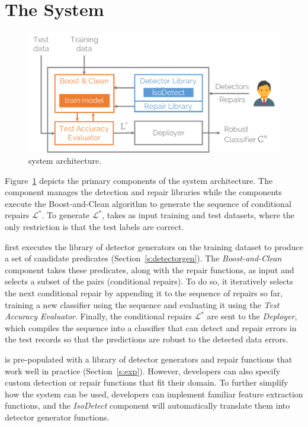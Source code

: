 \section{The \sys System}\label{s:arch}
 
\begin{figure}[t]
\centering
\includegraphics[width=\columnwidth]{figures/arch.pdf}
\caption{\sys system architecture.}
\label{f:arch}
\end{figure}

Figure~\ref{f:arch} depicts the primary components of the system architecture. The  component manages the detection and repair libraries while the  components execute the Boost-and-Clean algorithm to generate the sequence of conditional repairs $\mathcal{L}^*$.  To generate $\mathcal{L}^*$, \sys takes as input training and test datasets, where the only restriction is that the test labels are correct. 

\sys first executes the library of detector generators on the training dataset to produce a set of candidate predicates (Section~\ref{s:detectorgen}).    The {\it Boost-and-Clean} component takes these predicates, along with the repair functions, as input and selects a subset of the pairs (conditional repairs).  To do so, it iteratively selects the next conditional repair by appending it to the sequence of repairs so far, training a new classifier using the sequence and evaluating it using the {\it Test Accuracy Evaluator}.  Finally, the conditional repairs $\mathcal{L}^*$ are sent to the {\it Deployer}, which compiles the sequence into a  classifier that can detect and repair errors in the test records so that the predictions are robust to the detected data errors.  

\sys is pre-populated with a library of detector generators and repair functions that work well in practice (Section~\ref{s:exp}).  However,  developers can also specify custom detection or repair functions that fit their domain.  To further simplify how the system can be used, developers can implement familiar feature extraction functions, and the {\it IsoDetect} component will automatically translate them into detector generator functions.

